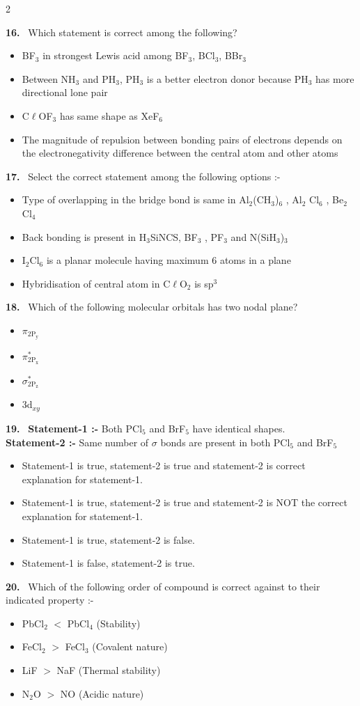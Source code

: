 \documentclass[10pt]{extarticle}
\newcommand{\qn}[1]{\par\smallskip\noindent\textbf{#1.}~}
\newenvironment{qoptions}{\begin{itemize}[leftmargin=1.8em,itemsep=1pt,topsep=2pt,label={}]}{\end{itemize}}
\newcommand{\opt}[2]{\item[(#1)] #2}
\begin{document}
\begin{multicols}{2}
\qn{16} Which statement is correct among the following?
\begin{qoptions}
\opt{A}{BF$_3$ in strongest Lewis acid among BF$_3$, BCl$_3$, BBr$_3$}
\opt{B}{Between NH$_3$ and PH$_3$, PH$_3$ is a better electron donor because PH$_3$ has more directional lone pair}
\opt{C}{C$\ell$OF$_3$ has same shape as XeF$_6$}
\opt{D}{The magnitude of repulsion between bonding pairs of electrons depends on the electronegativity difference between the central atom and other atoms}
\end{qoptions}

\qn{17} Select the correct statement among the following options :-
\begin{qoptions}
\opt{A}{Type of overlapping in the bridge bond is same in Al$_2$(CH$_3$)$_6$ , Al$_2$ Cl$_6$ , Be$_2$Cl$_4$}
\opt{B}{Back bonding is present in H$_3$SiNCS, BF$_3$ , PF$_3$ and N(SiH$_3$)$_3$}
\opt{C}{I$_2$Cl$_6$ is a planar molecule having maximum 6 atoms in a plane}
\opt{D}{Hybridisation of central atom in C$\ell$O$_2$ is sp$^3$}
\end{qoptions}

\qn{18} Which of the following molecular orbitals has two nodal plane?
\begin{qoptions}
\opt{A}{$\pi_{2\mathrm{P_y}}$}
\opt{B}{$\pi^*_{2\mathrm{P_x}}$}
\opt{C}{$\sigma^*_{2\mathrm{P_z}}$}
\opt{D}{3d$_{xy}$}
\end{qoptions}

\qn{19} \textbf{Statement-1 :-} Both PCl$_5$ and BrF$_5$ have identical shapes.\\
\textbf{Statement-2 :-} Same number of $\sigma$ bonds are present in both PCl$_5$ and BrF$_5$
\begin{qoptions}
\opt{A}{Statement-1 is true, statement-2 is true and statement-2 is correct explanation for statement-1.}
\opt{B}{Statement-1 is true, statement-2 is true and statement-2 is NOT the correct explanation for statement-1.}
\opt{C}{Statement-1 is true, statement-2 is false.}
\opt{D}{Statement-1 is false, statement-2 is true.}
\end{qoptions}

\qn{20} Which of the following order of compound is correct against to their indicated property :-
\begin{qoptions}
\opt{A}{PbCl$_2$ $<$ PbCl$_4$ (Stability)}
\opt{B}{FeCl$_2$ $>$ FeCl$_3$ (Covalent nature)}
\opt{C}{LiF $>$ NaF (Thermal stability)}
\opt{D}{N$_2$O $>$ NO (Acidic nature)}
\end{qoptions}


\end{multicols}
\end{document}
